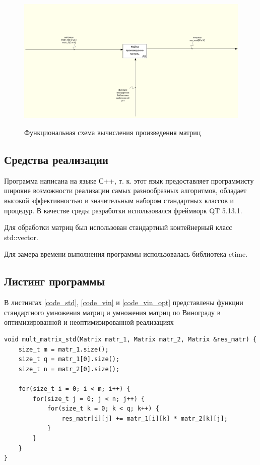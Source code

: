 \documentclass[a4paper,12pt]{article}
\begin{document}
        \begin{figure}[h!]
        	\begin{center}
        		{\includegraphics[width = \textwidth]{idef0.png}}
        		\caption{Функциональная схема вычисления произведения матриц}
        		\label{fig:idef0}
        	\end{center}
        \end{figure}
        
	
	\subsection{Средства реализации}
	Программа написана на языке С++, т. к. этот язык предоставляет программисту широкие возможности реализации самых разнообразных алгоритмов, обладает высокой эффективностью и значительным набором стандартных классов и процедур. В качестве среды разработки использовался  фреймворк QT 5.13.1.
	
	Для обработки матриц был использован стандартный контейнерный класс std::vector.
	
	Для замера времени выполнения программы использовалась библиотека ctime.
	

    
    \subsection{Листинг программы}
	В листингах \ref{code_std},  \ref{code_vin} и \ref{code_vin_opt} представлены функции стандартного умножения матриц и умножения матриц по Винограду в оптимизированной и неоптимизированной реализациях
	
	\begin{center}
	\begin{lstlisting}[label=code_std, caption={Стандартный алгоритм умножения матриц}]
void mult_matrix_std(Matrix matr_1, Matrix matr_2, Matrix &res_matr) {
    size_t m = matr_1.size();
    size_t q = matr_1[0].size();
    size_t n = matr_2[0].size();

    for(size_t i = 0; i < m; i++) {
        for(size_t j = 0; j < n; j++) {
            for(size_t k = 0; k < q; k++) {
                res_matr[i][j] += matr_1[i][k] * matr_2[k][j];
            }
        }
    }
}
    \end{lstlisting}
    \end{center}  
\end{document}
